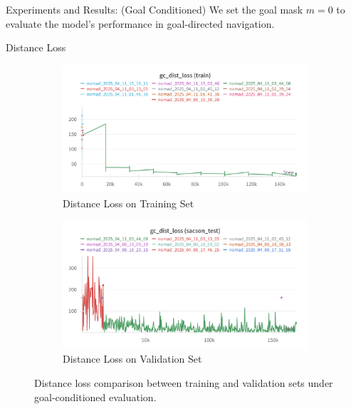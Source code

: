 \documentclass{beamer}
\begin{document}
\begin{frame}{Experiments and Results: (Goal Conditioned)}
We set the goal mask $m = 0$ to evaluate the model's performance in goal-directed navigation.
\begin{block}{Distance Loss}
    \begin{figure}[H]
        \centering
        \begin{subfigure}[b]{0.48\textwidth}
            \includegraphics[width=\textwidth]{images/gc_distloss_nomad.png}
            \caption{Distance Loss on Training Set}
            \label{fig:gc_dist_loss_train}
        \end{subfigure}
        \hfill
        \begin{subfigure}[b]{0.48\textwidth}
            \includegraphics[width=\textwidth]{images/gc_dist_loss_test.png}
            \caption{Distance Loss on Validation Set}
            \label{fig:gc_dist_loss_val}
        \end{subfigure}
        \caption{Distance loss comparison between training and validation sets under goal-conditioned evaluation.}
    \end{figure}
\end{block}

\end{frame}
\end{document}

